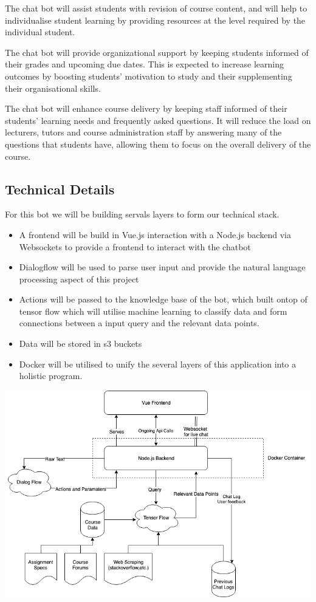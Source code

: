 \documentclass{article}
\begin{document}
The chat bot will assist students with revision of course content, and will help to individualise student learning by providing resources at the level required by the individual student.

The chat bot will provide organizational support by keeping students informed of their grades and upcoming due dates. This is expected to increase learning outcomes by boosting students' motivation to study and their supplementing their organisational skills.

The chat bot will enhance course delivery by keeping staff informed of their students' learning needs and frequently asked questions. It will reduce the load on lecturers, tutors and course administration staff by answering many of the questions that students have, allowing them to focus on the overall delivery of the course. 


\subsection{Technical Details}

For this bot we will be building servals layers to form our technical stack.

\begin{itemize}
  \item A frontend will be build in Vue.js interaction with a Node.js backend via Websockets to provide a frontend to interact with the chatbot
  \item Dialogflow will be used to parse user input and provide the natural language processing aspect of this project
  \item Actions will be passed to the knowledge base of the bot, which built ontop of tensor flow which will utilise machine learning to classify data and form connections between a input query and the relevant data points.
  \item Data will be stored in s3 buckets
  \item Docker will be utilised to unify the several layers of this application into a holistic program. 
\end{itemize}

\includegraphics[width=\textwidth]{architecture_diagram.png}
\end{document}
